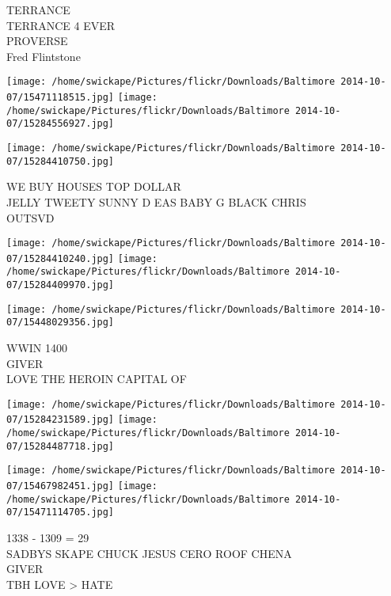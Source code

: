 \documentclass[10pt,letterpaper]{article}
\begin{document}
TERRANCE\\
TERRANCE 4 EVER\\
PROVERSE\\
Fred Flintstone
\pagebreak

\texttt{[image: /home/swickape/Pictures/flickr/Downloads/Baltimore 2014-10-07/15471118515.jpg]}
\texttt{[image: /home/swickape/Pictures/flickr/Downloads/Baltimore 2014-10-07/15284556927.jpg]}

\vspace{0.25in}
\texttt{[image: /home/swickape/Pictures/flickr/Downloads/Baltimore 2014-10-07/15284410750.jpg]}

WE BUY HOUSES TOP DOLLAR\\
JELLY TWEETY SUNNY D EAS BABY G BLACK CHRIS\\
OUTSVD
\pagebreak

\texttt{[image: /home/swickape/Pictures/flickr/Downloads/Baltimore 2014-10-07/15284410240.jpg]}
\texttt{[image: /home/swickape/Pictures/flickr/Downloads/Baltimore 2014-10-07/15284409970.jpg]}

\vspace{0.25in}
\texttt{[image: /home/swickape/Pictures/flickr/Downloads/Baltimore 2014-10-07/15448029356.jpg]}

WWIN 1400\\
GIVER\\
LOVE THE HEROIN CAPITAL OF
\pagebreak

\texttt{[image: /home/swickape/Pictures/flickr/Downloads/Baltimore 2014-10-07/15284231589.jpg]}
\texttt{[image: /home/swickape/Pictures/flickr/Downloads/Baltimore 2014-10-07/15284487718.jpg]}

\texttt{[image: /home/swickape/Pictures/flickr/Downloads/Baltimore 2014-10-07/15467982451.jpg]}
\texttt{[image: /home/swickape/Pictures/flickr/Downloads/Baltimore 2014-10-07/15471114705.jpg]}

1338 {-} 1309 = 29\\
SADBYS SKAPE CHUCK JESUS CERO ROOF CHENA\\
GIVER\\
TBH LOVE > HATE
\pagebreak
\end{document}
